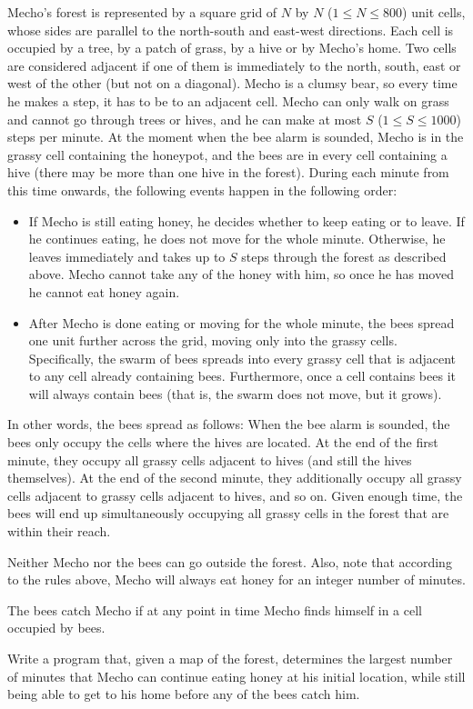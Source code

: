 \documentclass[11pt]{book}
\begin{document}
\begin{enumerate}
Mecho's forest is represented by a square grid of $N$ by $N$ ($1 \le N \le 800$) unit cells, whose sides are parallel to the north-south and east-west directions. Each cell is occupied by a tree, by a patch of grass, by a hive or by Mecho's home. Two cells are considered adjacent if one of them is immediately to the north, south, east or west of the other (but not on a diagonal). Mecho is a clumsy bear, so every time he makes a step, it has to be to an adjacent cell. Mecho can only walk on grass and cannot go through trees or hives, and he can make at most $S$ ($1 \le S \le 1000$) steps per minute. At the moment when the bee alarm is sounded, Mecho is in the grassy cell containing the honeypot, and the bees are in every cell containing a hive (there may be more than one hive in the forest). During each minute from this time onwards, the following events happen in the following order:
\begin{itemize}
\item
If Mecho is still eating honey, he decides whether to keep eating or to leave. If he continues eating, he does not move for the whole minute. Otherwise, he leaves immediately and takes up to $S$ steps through the forest as described above. Mecho cannot take any of the honey with him, so once he has moved he cannot eat honey again.
\item
After Mecho is done eating or moving for the whole minute, the bees spread one unit further across the grid, moving only into the grassy cells. Specifically, the swarm of bees spreads into every grassy cell that is adjacent to any cell already containing bees. Furthermore, once a cell contains bees it will always contain bees (that is, the swarm does not move, but it grows).
\end{itemize}
In other words, the bees spread as follows: When the bee alarm is sounded, the bees only occupy the cells where the hives are located. At the end of the first minute, they occupy all grassy cells adjacent to hives (and still the hives themselves). At the end of the second minute, they additionally occupy all grassy cells adjacent to grassy cells adjacent to hives, and so on. Given enough time, the bees will end up simultaneously occupying all grassy cells in the forest that are within their reach.

Neither Mecho nor the bees can go outside the forest. Also, note that according to the rules above, Mecho will always eat honey for an integer number of minutes.

The bees catch Mecho if at any point in time Mecho finds himself in a cell occupied by bees.

Write a program that, given a map of the forest, determines the largest number of minutes that Mecho can continue eating honey at his initial location, while still being able to get to his home before any of the bees catch him.

\end{enumerate}
\end{document}
